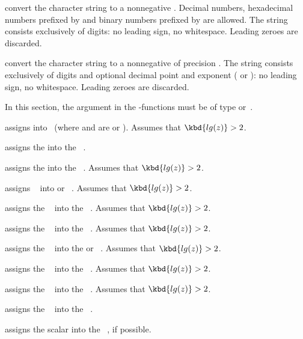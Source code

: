 convert the character string  to a
nonnegative .
Decimal numbers, hexadecimal numbers prefixed by  and binary numbers prefixed
by  are allowed.  The string  consists exclusively of digits:
no leading sign, no whitespace. Leading zeroes are discarded.

 convert the character string  to
a nonnegative  of precision . The string 
consists exclusively of digits and optional decimal point and exponent
( or ): no leading sign, no whitespace. Leading zeroes are
discarded.

In this section, the  argument in the -functions must be of type
 or~.

 assigns  into~ (where 
and  are  or ).
Assumes that $\kbd{lg(z)} > 2$.

 assigns the   into the
~.

 assigns the   into the
~. Assumes that $\kbd{lg(z)} > 2$.

 assigns ~ into  or
~. Assumes that $\kbd{lg(z)} > 2$.

 assigns the ~ into the
~. Assumes that $\kbd{lg(z)} > 2$.

 assigns the ~ into the
~. Assumes that $\kbd{lg(z)} > 2$.

 assigns the ~ into the
 or ~. Assumes that $\kbd{lg(z)} > 2$.

 assigns the ~ into the
~. Assumes that $\kbd{lg(z)} > 2$.

 assigns the ~ into the
~. Assumes that $\kbd{lg(z)} > 2$.

 assigns the ~ into the
~.

 assigns the scalar  into the
~, if possible.

